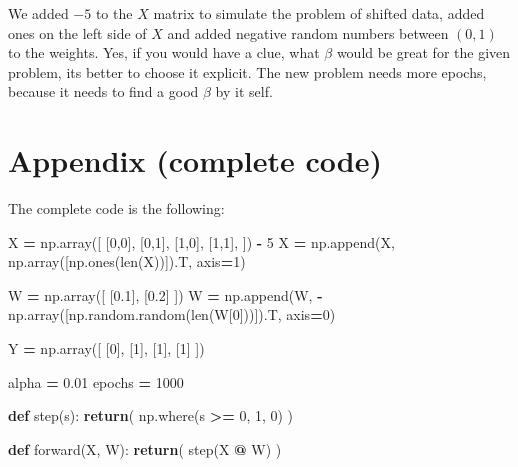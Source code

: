 \documentclass[
]{book}
\newenvironment{Shaded}{\begin{snugshade}}{\end{snugshade}}
\newcommand{\BuiltInTok}[1]{#1}
\newcommand{\ControlFlowTok}[1]{\textcolor[rgb]{0.13,0.29,0.53}{\textbf{#1}}}
\newcommand{\DecValTok}[1]{\textcolor[rgb]{0.00,0.00,0.81}{#1}}
\newcommand{\FloatTok}[1]{\textcolor[rgb]{0.00,0.00,0.81}{#1}}
\newcommand{\KeywordTok}[1]{\textcolor[rgb]{0.13,0.29,0.53}{\textbf{#1}}}
\newcommand{\NormalTok}[1]{#1}
\newcommand{\OperatorTok}[1]{\textcolor[rgb]{0.81,0.36,0.00}{\textbf{#1}}}
\begin{document}
We added \(-5\) to the \(X\) matrix to simulate the problem of shifted data, added ones on the left side of \(X\) and added negative random numbers between \((0,1)\) to the weights. Yes, if you would have a clue, what \(\beta\) would be great for the given problem, its better to choose it explicit. The new problem needs more epochs, because it needs to find a good \(\beta\) by it self.

\hypertarget{appendix-complete-code-1}{%
\section{Appendix (complete code)}\label{appendix-complete-code-1}}

The complete code is the following:

\begin{Shaded}
\begin{Highlighting}[]
\NormalTok{X }\OperatorTok{=}\NormalTok{ np.array([}
\NormalTok{  [}\DecValTok{0}\NormalTok{,}\DecValTok{0}\NormalTok{],}
\NormalTok{  [}\DecValTok{0}\NormalTok{,}\DecValTok{1}\NormalTok{],}
\NormalTok{  [}\DecValTok{1}\NormalTok{,}\DecValTok{0}\NormalTok{],}
\NormalTok{  [}\DecValTok{1}\NormalTok{,}\DecValTok{1}\NormalTok{],}
\NormalTok{]) }\OperatorTok{{-}} \DecValTok{5}
\NormalTok{X }\OperatorTok{=}\NormalTok{ np.append(X, np.array([np.ones(}\BuiltInTok{len}\NormalTok{(X))]).T, axis}\OperatorTok{=}\DecValTok{1}\NormalTok{)}

\NormalTok{W }\OperatorTok{=}\NormalTok{ np.array([}
\NormalTok{  [}\FloatTok{0.1}\NormalTok{], }
\NormalTok{  [}\FloatTok{0.2}\NormalTok{]}
\NormalTok{])}
\NormalTok{W }\OperatorTok{=}\NormalTok{ np.append(W, }\OperatorTok{{-}}\NormalTok{np.array([np.random.random(}\BuiltInTok{len}\NormalTok{(W[}\DecValTok{0}\NormalTok{]))]).T, axis}\OperatorTok{=}\DecValTok{0}\NormalTok{)}

\NormalTok{Y }\OperatorTok{=}\NormalTok{ np.array([}
\NormalTok{  [}\DecValTok{0}\NormalTok{],}
\NormalTok{  [}\DecValTok{1}\NormalTok{],}
\NormalTok{  [}\DecValTok{1}\NormalTok{],}
\NormalTok{  [}\DecValTok{1}\NormalTok{]}
\NormalTok{])}

\NormalTok{alpha }\OperatorTok{=} \FloatTok{0.01}
\NormalTok{epochs }\OperatorTok{=} \DecValTok{1000}

\KeywordTok{def}\NormalTok{ step(s):}
  \ControlFlowTok{return}\NormalTok{( np.where(s }\OperatorTok{\textgreater{}=} \DecValTok{0}\NormalTok{, }\DecValTok{1}\NormalTok{, }\DecValTok{0}\NormalTok{) )}


\KeywordTok{def}\NormalTok{ forward(X, W):}
  \ControlFlowTok{return}\NormalTok{( step(X }\OperatorTok{@}\NormalTok{ W) )}


\end{Highlighting}
\end{Shaded}
\end{document}
